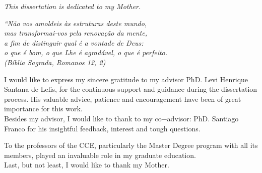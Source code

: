 \documentclass[
	12pt,				%
	openright,		%
	oneside,			%
	a4paper,			%
	english,			%
	french,				%
	spanish,			%
	brazil				%
	]{abntex2}
\begin{document}
\begin{dedicatoria}
   \vspace*{\fill}
   \centering
   \noindent
   \textit{ This dissertation is dedicated to my Mother.} \vspace*{\fill}
\end{dedicatoria}
\begin{epigrafe}
    \vspace*{\fill}
	\begin{flushright}
		\textit{``Não vos amoldeis às estruturas deste mundo, \\
		mas transformai-vos pela renovação da mente, \\
		a fim de distinguir qual é a vontade de Deus: \\
		o que é bom, o que Lhe é agradável, o que é perfeito.\\
		(Bíblia Sagrada, Romanos 12, 2)}
	\end{flushright}
\end{epigrafe}

\begin{agradecimentos}
I would like to express my sincere gratitude to my advisor PhD. Levi Henrique Santana de Lelis, for the continuous support and guidance during the dissertation process. His valuable advice, patience and encouragement have been of great
importance for this work. \\

Besides my advisor, I would like to thank to my co$-$advisor: PhD. Santiago Franco for his insightful feedback, interest and tough questions.

To the professors of the CCE, particularly the Master Degree program with all its members, played an invaluable role in my graduate education. \\

Last, but not least, I would like to thank my Mother.
\end{agradecimentos}


\tableofcontents*
\newpage

\listoffigures*
\newpage

\listoftables*
\newpage
\end{document}
